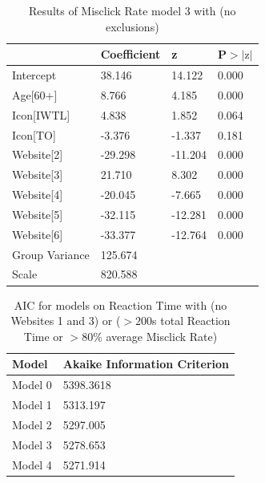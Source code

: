 \documentclass[12pt,twoside]{reedthesis}
\begin{document}
\begin{table}[h!]
        \centering
        \begin{tabular}{| p{5cm} | p{2.5cm} | p{2.5cm} | p{2.5cm} |}
            \hline
            & Coefficient & z & P$>|\text{z}|$\\
            \hline
            Intercept & 38.146 & 14.122 & 0.000\\
            \hline
            Age[60+] & 8.766 & 4.185 & 0.000\\
            \hline
            Icon[IWTL] & 4.838 & 1.852 & 0.064\\
            \hline
            Icon[TO] & -3.376 & -1.337 & 0.181\\
            \hline
            Website[2] & -29.298 & -11.204 & 0.000\\
            \hline
            Website[3] & 21.710 & 8.302 & 0.000\\
            \hline
            Website[4] & -20.045 & -7.665 & 0.000\\
            \hline
            Website[5] & -32.115 & -12.281 & 0.000\\
            \hline
            Website[6] & -33.377 & -12.764 & 0.000\\
            \hline
            Group Variance & 125.674 &&\\
            \hline
            Scale & 820.588 &&\\
            \hline
        \end{tabular}
        \caption{Results of Misclick Rate model 3 with (no exclusions)}
    \end{table}


\begin{table}[h!]
        \centering
        \begin{tabular}{| p{3.5cm} | p{7.5cm} |}
            \hline
            Model & Akaike Information Criterion\\
            \hline
            Model 0 & 5398.3618\\
            \hline
            Model 1 & 5313.197\\
            \hline
            Model 2 & 5297.005\\
            \hline
            Model 3 & 5278.653\\
            \hline
            Model 4 & 5271.914\\
            \hline
        \end{tabular}
        \caption{AIC for models on Reaction Time with (no Websites 1 and 3) or ($>200$s total Reaction Time or $>80$\% average Misclick Rate)}
    \end{table}
\end{document}
